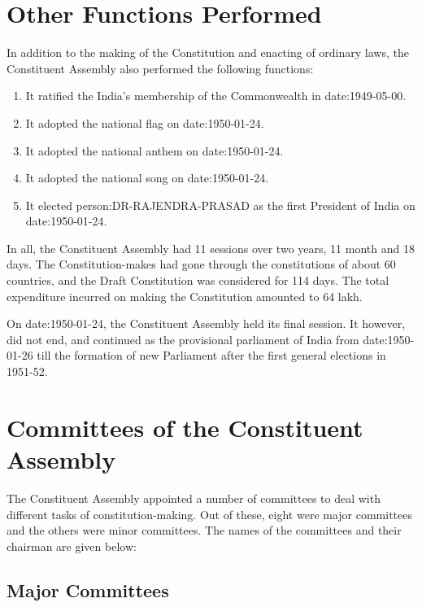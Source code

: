 \section{Other Functions Performed}

In addition to the making of the Constitution and enacting of ordinary laws, the Constituent Assembly also performed the following functions:

\begin{enumerate}
  \item It ratified the India's membership of the Commonwealth in \gls{date:1949-05-00}.
  \item It adopted the national flag on \gls{date:1950-01-24}.
  \item It adopted the national anthem on \gls{date:1950-01-24}.
  \item It adopted the national song on \gls{date:1950-01-24}.
  \item It elected \gls{person:DR-RAJENDRA-PRASAD} as the first President of India on \gls{date:1950-01-24}.
\end{enumerate}

In all, the Constituent Assembly had 11 sessions over two years, 11 month and 18 days. The Constitution-makes had gone through the constitutions of about 60 countries, and the Draft Constitution was considered for 114 days. The total expenditure incurred on making the Constitution amounted to 64 lakh.

On \gls{date:1950-01-24}, the Constituent Assembly held its final session. It however, did not end, and continued as the provisional parliament of India from \gls{date:1950-01-26} till the formation of new Parliament after the first general elections in 1951-52.

\section{Committees of the Constituent Assembly}

The Constituent Assembly appointed a number of committees to deal with different tasks of constitution-making. Out of these, eight were major committees and the others were minor committees. The names of the committees and their chairman are given below:

\subsection{Major Committees}

